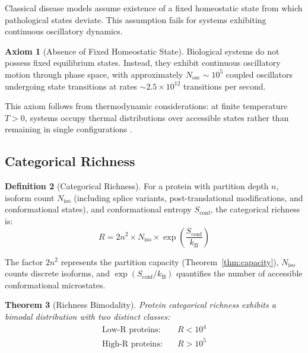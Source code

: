 \documentclass[11pt,twocolumn,a4paper]{article}
\newtheorem{theorem}{Theorem}[section]
\theoremstyle{definition}
\newtheorem{definition}[theorem]{Definition}
\newtheorem{axiom}[theorem]{Axiom}
\theoremstyle{remark}
\newcommand{\kB}{k_{\mathrm{B}}}
\begin{document}
Classical disease models assume existence of a fixed homeostatic state from which pathological states deviate. This assumption fails for systems exhibiting continuous oscillatory dynamics.

\begin{axiom}[Absence of Fixed Homeostatic State]
\label{ax:no_homeostasis}
Biological systems do not possess fixed equilibrium states. Instead, they exhibit continuous oscillatory motion through phase space, with approximately $N_{\mathrm{osc}} \sim 10^5$ coupled oscillators undergoing state transitions at rates $\sim 2.5 \times 10^{12}$ transitions per second.
\end{axiom}

This axiom follows from thermodynamic considerations: at finite temperature $T > 0$, systems occupy thermal distributions over accessible states rather than remaining in single configurations \citep{landau1980statistical,pathria2011statistical}.

\subsection{Categorical Richness}

\begin{definition}[Categorical Richness]
\label{def:categorical_richness}
For a protein with partition depth $n$, isoform count $N_{\mathrm{iso}}$ (including splice variants, post-translational modifications, and conformational states), and conformational entropy $S_{\mathrm{conf}}$, the categorical richness is:
\begin{equation}
R = 2n^2 \times N_{\mathrm{iso}} \times \exp\left(\frac{S_{\mathrm{conf}}}{\kB}\right)
\label{eq:categorical_richness}
\end{equation}
\end{definition}

The factor $2n^2$ represents the partition capacity (Theorem~\ref{thm:capacity}), $N_{\mathrm{iso}}$ counts discrete isoforms, and $\exp(S_{\mathrm{conf}}/\kB)$ quantifies the number of accessible conformational microstates.

\begin{theorem}[Richness Bimodality]
\label{thm:richness_bimodality}
Protein categorical richness exhibits a bimodal distribution with two distinct classes:
\begin{align}
\text{Low-R proteins:} \quad &R < 10^4 \label{eq:low_R} \\
\text{High-R proteins:} \quad &R > 10^5 \label{eq:high_R}
\end{align}
\end{theorem}
\end{document}
